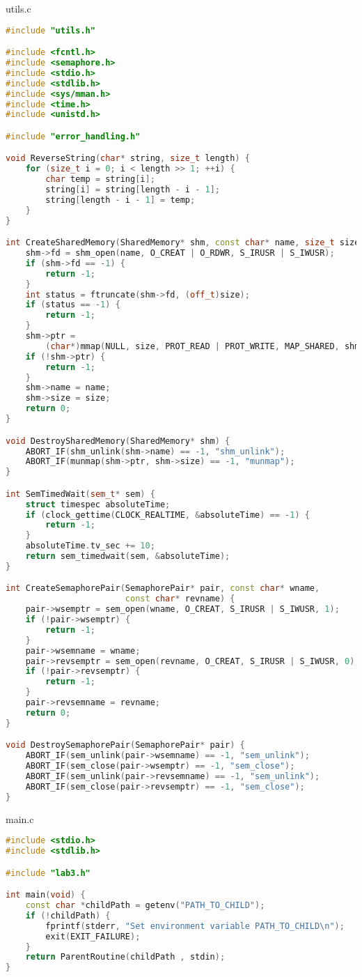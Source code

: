 \documentclass[a4paper, 12pt]{article}
\begin{document}
utils.c
\begin{lstlisting}[language=C++]
#include "utils.h"

#include <fcntl.h>
#include <semaphore.h>
#include <stdio.h>
#include <stdlib.h>
#include <sys/mman.h>
#include <time.h>
#include <unistd.h>

#include "error_handling.h"

void ReverseString(char* string, size_t length) {
    for (size_t i = 0; i < length >> 1; ++i) {
        char temp = string[i];
        string[i] = string[length - i - 1];
        string[length - i - 1] = temp;
    }
}

int CreateSharedMemory(SharedMemory* shm, const char* name, size_t size) {
    shm->fd = shm_open(name, O_CREAT | O_RDWR, S_IRUSR | S_IWUSR);
    if (shm->fd == -1) {
        return -1;
    }
    int status = ftruncate(shm->fd, (off_t)size);
    if (status == -1) {
        return -1;
    }
    shm->ptr =
        (char*)mmap(NULL, size, PROT_READ | PROT_WRITE, MAP_SHARED, shm->fd, 0);
    if (!shm->ptr) {
        return -1;
    }
    shm->name = name;
    shm->size = size;
    return 0;
}

void DestroySharedMemory(SharedMemory* shm) {
    ABORT_IF(shm_unlink(shm->name) == -1, "shm_unlink");
    ABORT_IF(munmap(shm->ptr, shm->size) == -1, "munmap");
}

int SemTimedWait(sem_t* sem) {
    struct timespec absoluteTime;
    if (clock_gettime(CLOCK_REALTIME, &absoluteTime) == -1) {
        return -1;
    }
    absoluteTime.tv_sec += 10;
    return sem_timedwait(sem, &absoluteTime);
}

int CreateSemaphorePair(SemaphorePair* pair, const char* wname,
                        const char* revname) {
    pair->wsemptr = sem_open(wname, O_CREAT, S_IRUSR | S_IWUSR, 1);
    if (!pair->wsemptr) {
        return -1;
    }
    pair->wsemname = wname;
    pair->revsemptr = sem_open(revname, O_CREAT, S_IRUSR | S_IWUSR, 0);
    if (!pair->revsemptr) {
        return -1;
    }
    pair->revsemname = revname;
    return 0;
}

void DestroySemaphorePair(SemaphorePair* pair) {
    ABORT_IF(sem_unlink(pair->wsemname) == -1, "sem_unlink");
    ABORT_IF(sem_close(pair->wsemptr) == -1, "sem_close");
    ABORT_IF(sem_unlink(pair->revsemname) == -1, "sem_unlink");
    ABORT_IF(sem_close(pair->revsemptr) == -1, "sem_close");
}
\end{lstlisting}

main.c
\begin{lstlisting}[language=C++]
#include <stdio.h>
#include <stdlib.h>

#include "lab3.h"

int main(void) {
    const char *childPath = getenv("PATH_TO_CHILD");
    if (!childPath) {
        fprintf(stderr, "Set environment variable PATH_TO_CHILD\n");
        exit(EXIT_FAILURE);
    }
    return ParentRoutine(childPath , stdin);
}
\end{lstlisting}
\end{document}
